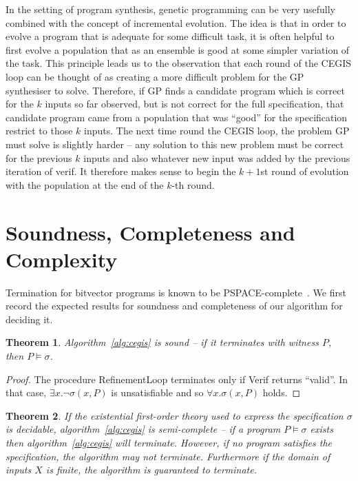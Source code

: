 \documentclass[preprint]{sigplanconf}
\newtheorem{theorem}{Theorem}
\theoremstyle{definition}
\begin{document}
In the setting of program synthesis, genetic programming can be very
usefully combined with the concept of incremental evolution.  The idea is
that in order to evolve a program that is adequate for some difficult task,
it is often helpful to first evolve a population that as an ensemble is good
at some simpler variation of the task.  This principle leads us to the
observation that each round of the CEGIS loop can be thought of as creating
a more difficult problem for the GP synthesiser to solve.  Therefore, if GP
finds a candidate program which is correct for the $k$ inputs so far
observed, but is not correct for the full specification, that candidate
program came from a population that was ``good'' for the specification
restrict to those $k$ inputs.  The next time round the CEGIS loop, the
problem GP must solve is slightly harder -- any solution to this new problem
must be correct for the previous $k$ inputs and also whatever new input was
added by the previous iteration of {\sc verif}.  It therefore makes sense to
begin the $k+1$st round of evolution with the population at the end of the
$k$-th round.


\section{Soundness, Completeness and Complexity}

Termination for bitvector programs is known to be
PSPACE-complete~\cite{DBLP:conf/tacas/CookKRW10}.  We first record the
expected results for soundness and completeness of our algorithm for
deciding it.
%
\begin{theorem}\label{thm:synth-sound}
Algorithm~\ref{alg:cegis} is sound -- if it terminates with witness $P$, then
$P \models \sigma$.
\end{theorem}

\begin{proof}
 The procedure {\sc RefinementLoop} terminates only if {\sc Verif} returns ``valid''.  In that
 case, $\exists x . \lnot \sigma(x, P)$ is unsatisfiable and so $\forall x . \sigma(x, P)$ holds.
\end{proof}

\begin{theorem}
 \label{thm:synth-semicomplete}
 If the existential first-order theory used to express the specification $\sigma$ is decidable,
 algorithm~\ref{alg:cegis} is semi-complete -- if a program $P \models \sigma$
 exists then algorithm~\ref{alg:cegis} will terminate.  However, if no program
 satisfies the specification, the algorithm may not terminate.  Furthermore if the domain of inputs $X$
 is finite, the algorithm is guaranteed to terminate.
\end{theorem}
\end{document}
